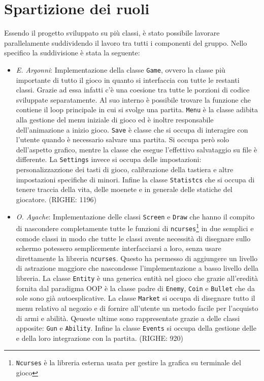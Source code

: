 \documentclass[a4paper]{article}
\begin{document}
\section{Spartizione dei ruoli}
Essendo il progetto sviluppato su più classi, è stato possibile lavorare 
parallelamente suddividendo il lavoro tra tutti i componenti del gruppo. Nello 
specifico la suddivisione è stata la seguente:
\begin{itemize}
  \item \emph{E. Argonni}: Implementazione della classe \texttt{Game}, ovvero la 
    classe più importante di tutto il gioco in quanto si interfaccia con tutte 
    le restanti classi. Grazie ad essa infatti c'è una coesione tra tutte le 
    porzioni di codice sviluppate separatamente. Al suo interno è possibile 
    trovare la funzione che contiene il loop principale in cui si  svolge una 
    partita. \texttt{Menu} è la classe adibita alla gestione del menu iniziale 
    di gioco ed è inoltre responsabile dell'animazione a inizio gioco.
    \texttt{Save} è classe che si occupa di interagire con l'utente quando è 
    necessario salvare una partita. Si occupa però solo dell'aspetto grafico, 
    mentre la classe che esegue l'effettivo salvataggio su file è differente. 
    La \texttt{Settings} invece si occupa delle impostazioni: personalizzazzione 
    dei tasti di gioco, calibrazione della tastiera e altre impostazioni 
    specifiche di minori. Infine la classe \texttt{Statistcs} che si occupa di 
    tenere traccia della vita, delle moenete e in generale delle statiche del 
    giocatore. (RIGHE: 1196)

  \item \emph{O. Ayache}: Implementazione delle classi \texttt{Screen} e 
    \texttt{Draw} che hanno il compito di nascondere completamente tutte le 
    funzioni di \texttt{ncurses}\footnote{\texttt{Ncurses} è la libreria esterna usata per gestire la grafica su terminale del gioco} in due semplici e comode 
    classi in modo che tutte le classi avente necessità di disegnare sullo 
    schermo potessero semplicemente interfacciarsi a loro, senza usare 
    direttamente la libreria \texttt{ncurses}. Questo ha permesso di aggiungere 
    un livello di astrazione maggiore che nascondesse l'implementazione a basso 
    livello della libreria. La classe \texttt{Entity} è una generica entità nel
    gioco che grazie all'eredità fornita dal paradigma OOP è la classe padre di
    \texttt{Enemy}, \texttt{Coin} e \texttt{Bullet} che da sole sono già 
    autoesplicative. La classe \texttt{Market} si occupa di disegnare tutto il 
    menu relativo al negozio e di fornire all'utente un metodo facile per 
    l'acquisto di armi e abilità. Qeueste ultime sono rappresentate grazie a
    delle classi apposite: \texttt{Gun} e \texttt{Ability}. Infine la classe 
    \texttt{Events} si occupa della gestione delle e della loro integrazione con
    la partita. (RIGHE: 920)


\end{itemize}
\end{document}
